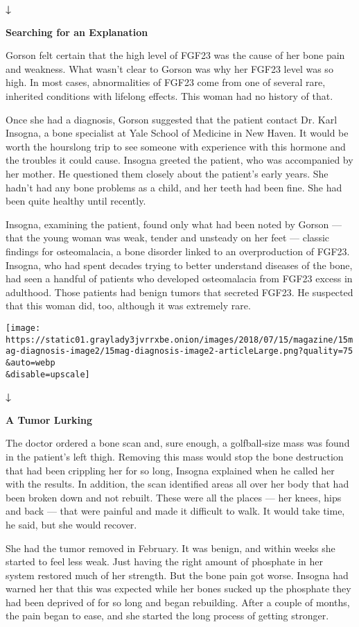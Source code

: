 \textbf{↓}

\textbf{Searching for an Explanation}

Gorson felt certain that the high level of FGF23 was the cause of her
bone pain and weakness. What wasn't clear to Gorson was why her FGF23
level was so high. In most cases, abnormalities of FGF23 come from one
of several rare, inherited conditions with lifelong effects. This woman
had no history of that.

Once she had a diagnosis, Gorson suggested that the patient contact Dr.
Karl Insogna, a bone specialist at Yale School of Medicine in New Haven.
It would be worth the hourslong trip to see someone with experience with
this hormone and the troubles it could cause. Insogna greeted the
patient, who was accompanied by her mother. He questioned them closely
about the patient's early years. She hadn't had any bone problems as a
child, and her teeth had been fine. She had been quite healthy until
recently.

Insogna, examining the patient, found only what had been noted by Gorson
--- that the young woman was weak, tender and unsteady on her feet ---
classic findings for osteomalacia, a bone disorder linked to an
overproduction of FGF23. Insogna, who had spent decades trying to better
understand diseases of the bone, had seen a handful of patients who
developed osteomalacia from FGF23 excess in adulthood. Those patients
had benign tumors that secreted FGF23. He suspected that this woman did,
too, although it was extremely rare.

\texttt{[image: https://static01.graylady3jvrrxbe.onion/images/2018/07/15/magazine/15mag-diagnosis-image2/15mag-diagnosis-image2-articleLarge.png?quality=75\\\&auto=webp\\\&disable=upscale]}

\textbf{↓}

\textbf{A Tumor Lurking}

The doctor ordered a bone scan and, sure enough, a golfball-size mass
was found in the patient's left thigh. Removing this mass would stop the
bone destruction that had been crippling her for so long, Insogna
explained when he called her with the results. In addition, the scan
identified areas all over her body that had been broken down and not
rebuilt. These were all the places --- her knees, hips and back --- that
were painful and made it difficult to walk. It would take time, he said,
but she would recover.

She had the tumor removed in February. It was benign, and within weeks
she started to feel less weak. Just having the right amount of phosphate
in her system restored much of her strength. But the bone pain got
worse. Insogna had warned her that this was expected while her bones
sucked up the phosphate they had been deprived of for so long and began
rebuilding. After a couple of months, the pain began to ease, and she
started the long process of getting stronger.

